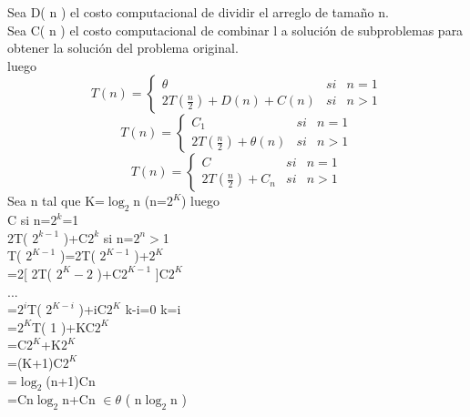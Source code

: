 \documentclass[spanish]{article}
\begin{document}
    \noindent Sea D( n ) el costo computacional de dividir el arreglo de tamaño n.\\
    \noindent Sea C( n ) el costo computacional de combinar l a solución de subproblemas para obtener la solución del problema original.\\
    luego\\
    \begin{equation}
        T( n )=\left \{ 
            \begin{array}{lcc}
            \theta & si & n=1\\
            2T( \frac{n}{2} )+D( n )+C( n ) & si & n>1
            \end{array}
        \right.  
    \end{equation}
    \newline
    \begin{equation}
    T( n )=\left \{ 
            \begin{array}{lcc}
            C_1 & si & n=1\\
            2T( \frac{n}{2} )+\theta( n ) & si & n>1
            \end{array}
        \right.
    \end{equation}
    \newline
    \begin{equation}
        T( n )=\left \{ 
            \begin{array}{lcc}
            C & si & n=1\\
            2T( \frac{n}{2} )+C_n & si & n>1
            \end{array}
        \right.
    \end{equation}
    \newline 
    \noindent Sea n tal que K=$\log_2$n (n=$2^K$) luego\\
    C si n=$2^k$=1\\
    2T( $2^{k-1}$ )+C$2^k$ si n=$2^n>$1\\
    T( $2^{K-1}$ )=2T( $2^{K-1}$ )+$2^K$\\
    =2[ 2T( $2^K-2$ )+C$2^{K-1}$ ]C$2^K$\\
    ...\\
    =$2^{i}$T( $2^{K-i}$ )+iC$2^K$ k-i=0 k=i\\
    =$2^K$T( 1 )+KC$2^K$\\
    =C$2^K$+K$2^K$\\
    =(K+1)C$2^K$\\
    =$\log_2$(n+1)Cn\\
    =Cn$\log_2$n+Cn $\in \theta$ ( n$\log_2$n ) 
\end{document}
